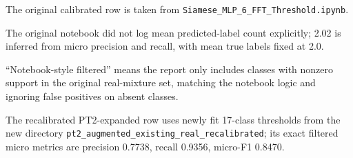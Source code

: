 \documentclass[11pt]{article}
\begin{document}
\begin{table}[ht]
\centering
\caption{Direct comparison of original and PT2-expanded Siamese+MLP Raman+FT results on the original real-mixture dataset}
\begin{threeparttable}
\small
\setlength{\tabcolsep}{5pt}

\begin{tablenotes}\footnotesize
\item The original calibrated row is taken from \texttt{Siamese\_MLP\_6\_FFT\_Threshold.ipynb}.
\item[a] The original notebook did not log mean predicted-label count explicitly; 2.02 is inferred from micro precision and recall, with mean true labels fixed at 2.0.
\item ``Notebook-style filtered'' means the report only includes classes with nonzero support in the original real-mixture set, matching the notebook logic and ignoring false positives on absent classes.
\item The recalibrated PT2-expanded row uses newly fit 17-class thresholds from the new directory \texttt{pt2\_augmented\_existing\_real\_recalibrated}; its exact filtered micro metrics are precision 0.7738, recall 0.9356, micro-F1 0.8470.
\end{tablenotes}
\end{threeparttable}
\end{table}
\end{document}
